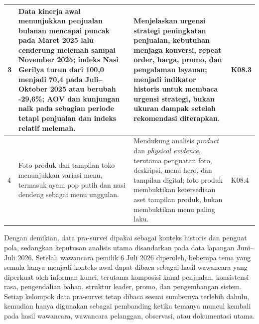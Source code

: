 \begin{xltabular}{\textwidth}{|C{0.7cm}|Y|L{4.4cm}|Z{1.8cm}|}
        3 & Data kinerja awal menunjukkan penjualan bulanan mencapai puncak pada Maret 2025 lalu cenderung melemah sampai November 2025; indeks Nasi Gerilya turun dari 100,0 menjadi 70,4 pada Juli--Oktober 2025 atau berubah -29,6\%; AOV dan kunjungan naik pada sebagian periode tetapi penjualan dan indeks relatif melemah. & Menjelaskan urgensi strategi peningkatan penjualan, kebutuhan menjaga konversi, repeat order, harga, promo, dan pengalaman layanan; menjadi indikator historis untuk membaca urgensi strategi, bukan ukuran dampak setelah rekomendasi diterapkan. & K08.3 \\  & Foto produk dan tampilan toko menunjukkan variasi menu, termasuk ayam pop putih dan nasi dendeng sebagai menu unggulan. & Mendukung analisis \textit{product} dan \textit{physical evidence}, terutama penguatan foto, deskripsi, menu hero, dan tampilan digital; foto produk membuktikan ketersediaan aset tampilan produk, bukan membuktikan menu paling laku. & K08.4 \\ \hline
    \end{xltabular}
\endgroup

Dengan demikian, data pra-survei dipakai sebagai konteks historis dan penguat pola, sedangkan keputusan analisis utama disandarkan pada data lapangan Juni--Juli 2026. Setelah wawancara pemilik 6 Juli 2026 diperoleh, beberapa tema yang semula hanya menjadi konteks awal dapat dibaca sebagai hasil wawancara yang diperkuat oleh informan kunci, terutama komposisi kanal penjualan, konsistensi rasa, pengendalian bahan, struktur leader, promo, dan pengembangan sistem. Setiap kelompok data pra-survei tetap dibaca sesuai sumbernya terlebih dahulu, kemudian hanya digunakan sebagai pembanding ketika temanya muncul kembali pada hasil wawancara, wawancara pelanggan, observasi, atau dokumentasi utama.
